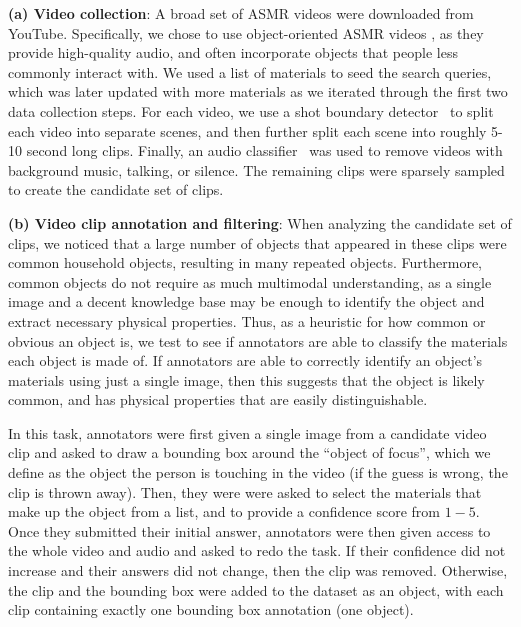 \documentclass[runningheads]{llncs}
\begin{document}
\noindent \textbf{(a) Video collection}: A broad set of ASMR videos were downloaded from YouTube. Specifically, we chose to use object-oriented ASMR videos
, as they provide high-quality audio, and often incorporate objects that people less commonly interact with.
We used a list of materials \cite{materiallist} to seed the search queries, which was later updated with more materials as we iterated through the first two data collection steps.
For each video, we use a shot boundary detector~\cite{souvcek2020transnet} to split each video into separate scenes, and then further split each scene into roughly 5-10 second long clips. Finally, an audio classifier~\cite{giannakopoulos2015pyaudioanalysis} was used to remove videos with background music, talking, or silence. The remaining clips were sparsely sampled to create the candidate set of clips.

\noindent \textbf{(b) Video clip annotation and filtering}: When analyzing the candidate set of clips, we noticed that a large number of objects that appeared in these clips were common household objects, resulting in many repeated objects. Furthermore, common objects do not require as much multimodal understanding, as a single image and a decent knowledge base may be enough to identify the object and extract necessary physical properties. Thus, as a heuristic for how common or obvious an object is, we test to see if annotators are able to classify the materials each object is made of. If annotators are able to correctly identify an object's materials using just a single image, then this suggests that the object is likely common, and has physical properties that are easily distinguishable. 

In this task, annotators were first given a single image from a candidate video clip and asked to draw a bounding box around the ``object of focus'', which we define as the object the person is touching in the video (if the guess is wrong, the clip is thrown away). Then, they were were asked to select the materials that make up the object from a list, and to provide a confidence score from $1-5$. Once they submitted their initial answer, annotators were then given access to the whole video and audio and asked to redo the task. If their confidence did not increase and their answers did not change, then the clip was removed. Otherwise, the clip and the bounding box were added to the dataset as an object, with each clip containing exactly one bounding box annotation (one object). 
\end{document}
